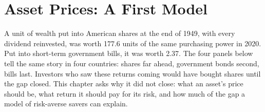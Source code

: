 \chapter{Asset Prices: A First Model}\label{ch:b2:asset-prices}

A unit of wealth put into American shares at the end of 1949, with every dividend reinvested, was
worth 177.6 units of the same purchasing power in 2020. Put into short-term government bills, it was
worth 2.37. The four panels below tell the same story in four countries: shares far ahead, government
bonds second, bills last. Investors who saw these returns coming would have bought shares until the gap
closed. This chapter asks why it did not close: what an asset's price should be, what return it should
pay for its risk, and how much of the gap a model of risk-averse savers can explain.

